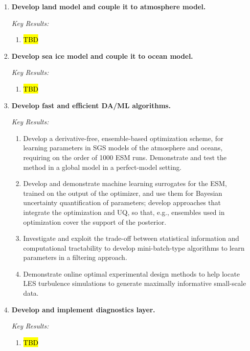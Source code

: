 \documentclass{article}
\begin{document}
\begin{enumerate}
\item \textbf{Develop land model and couple it to atmosphere model.}

   \emph{Key Results:}
     \begin{enumerate}
        \item \hl{TBD}
      \end{enumerate}
      
      \item \textbf{Develop sea ice model and couple it to ocean model.}

   \emph{Key Results:}
     \begin{enumerate}
        \item \hl{TBD}
      \end{enumerate}
    
    \item \textbf{Develop fast and efficient DA/ML algorithms.}
    
    \emph{Key Results:}
     \begin{enumerate}
        \item Develop a derivative-free, ensemble-based optimization scheme, for learning parameters in SGS models of the atmosphere and oceans, requiring on the order of 1000 ESM runs. Demonstrate and test the method in a global model in a perfect-model setting.
        \item Develop and demonstrate machine learning surrogates for the ESM, trained on the output of the optimizer, and use them for Bayesian uncertainty quantification of parameters; develop approaches that integrate the optimization and UQ, so that, e.g., ensembles used in optimization cover the support of the posterior.
        \item Investigate and exploit the trade-off between statistical information and computational tractability to develop mini-batch-type algorithms to learn parameters in a filtering approach.
        \item Demonstrate online optimal experimental design methods to help locate LES turbulence simulations to generate maximally informative small-scale data.
    \end{enumerate}

\item \textbf{Develop and implement diagnostics layer.}
    
    \emph{Key Results:}
     \begin{enumerate}
        \item \hl{TBD}
        \end{enumerate}
        

\end{enumerate}
\end{document}
